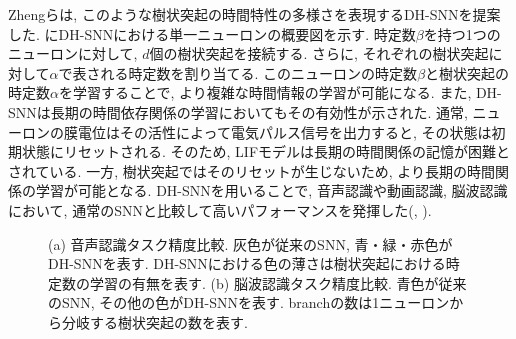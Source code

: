 Zhengらは, このような樹状突起の時間特性の多様さを表現するDH-SNNを提案した.
にDH-SNNにおける単一ニューロンの概要図を示す.
時定数$\beta$を持つ1つのニューロンに対して, $d$個の樹状突起を接続する.
さらに, それぞれの樹状突起に対して$\alpha$で表される時定数を割り当てる.
このニューロンの時定数$\beta$と樹状突起の時定数$\alpha$を学習することで, より複雑な時間情報の学習が可能になる.
また, DH-SNNは長期の時間依存関係の学習においてもその有効性が示された.
通常, ニューロンの膜電位はその活性によって電気パルス信号を出力すると, その状態は初期状態にリセットされる.
そのため, LIFモデルは長期の時間関係の記憶が困難とされている.
一方, 樹状突起ではそのリセットが生じないため, より長期の時間関係の学習が可能となる.
DH-SNNを用いることで, 音声認識や動画認識, 脳波認識において, 通常のSNNと比較して高いパフォーマンスを発揮した(, ).
\begin{figure}
    \centering

    \parbox{1.0\textwidth}{
        \centering

        \begin{minipage}{0.5336\textwidth}
            
            \label{fig:dhsnn:voice}
        \end{minipage}
        \hspace{0.02\textwidth}
        \begin{minipage}{0.3663\textwidth}
            
            \label{fig:dhsnn:brain}
        \end{minipage}

        \caption[DH-SNNにおける精度比較]{
            \cite{dhsnn}
            (a) 音声認識タスク精度比較.
            灰色が従来のSNN, 青・緑・赤色がDH-SNNを表す.
            DH-SNNにおける色の薄さは樹状突起における時定数の学習の有無を表す.
            (b) 脳波認識タスク精度比較.
            青色が従来のSNN, その他の色がDH-SNNを表す.
            branchの数は1ニューロンから分岐する樹状突起の数を表す.
        }
    }
\end{figure}
